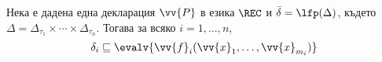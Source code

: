     

\begin{problem}
  Нека е дадена една декларация $\vv{P}$ в езика $\REC$
  и $\bar{\delta} = \lfp(\Delta)$, където $\Delta = \Delta_{\tau_1}\times\cdots\times \Delta_{\tau_n}$.
  Тогава за всяко $i = 1,\dots,n$,
  \[\delta_i \sqsubseteq \evalv{\vv{f}_i(\vv{x}_1,\dots,\vv{x}_{m_i})}\]
\end{problem}



